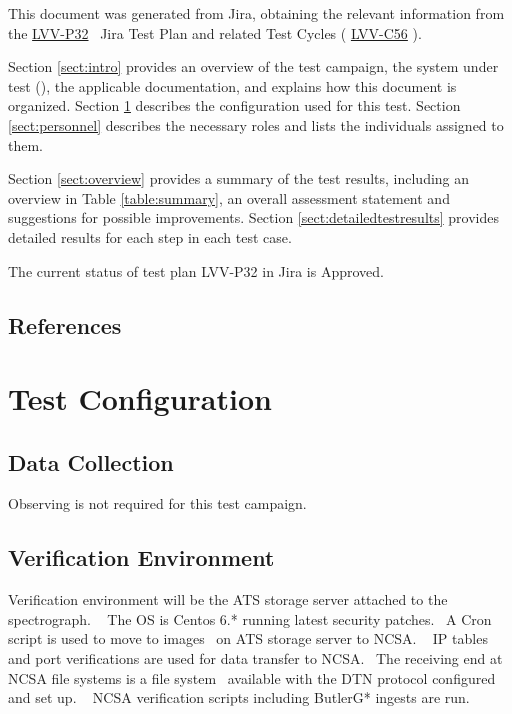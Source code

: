 \documentclass[DM,lsstdraft,STR,toc]{lsstdoc}
\begin{document}
This document was generated from Jira, obtaining the relevant information from the 
\href{https://jira.lsstcorp.org/secure/Tests.jspa#/testPlan/LVV-P32}{LVV-P32}
~Jira Test Plan and related Test Cycles (
  \href{https://jira.lsstcorp.org/secure/Tests.jspa#/testCycle/LVV-C56}{LVV-C56}
).

Section \ref{sect:intro} provides an overview of the test campaign, the system under test (\product{}), the applicable documentation, and explains how this document is organized.
Section \ref{sect:configuration}  describes the configuration used for this test.
Section \ref{sect:personnel} describes the necessary roles and lists the individuals assigned to them.

Section \ref{sect:overview} provides a summary of the test results, including an overview in Table \ref{table:summary}, an overall assessment statement and suggestions for possible improvements.
Section \ref{sect:detailedtestresults} provides detailed results for each step in each test case.

The current status of test plan LVV-P32 in Jira is Approved.

\subsection{References}
\label{sect:references}
\renewcommand{\refname}{}

\section{Test Configuration}
\label{sect:configuration}

\subsection{Data Collection}

  Observing is not required for this test campaign.

\subsection{Verification Environment}
\label{sect:hwconf}
  Verification environment will be the ATS storage server attached to the
spectrograph. ~ The OS is Centos 6.* running latest security patches. ~A
Cron script is used to move to images ~on ATS storage server to NCSA. ~
IP tables and port verifications are used for data transfer to NCSA.
~The receiving end at NCSA file systems is a file system ~available with
the DTN protocol configured and set up. ~ NCSA verification scripts
including ButlerG* ingests are run. ~\\[3\baselineskip]
\end{document}
